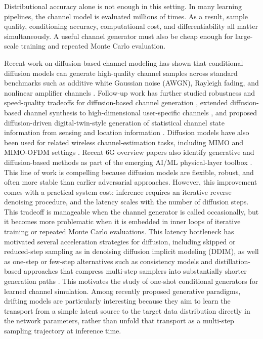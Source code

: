 \documentclass[conference]{IEEEtran}
\begin{document}
Distributional accuracy alone is not enough in this setting.
In many learning pipelines, the channel model is evaluated millions of times.
As a result, sample quality, conditioning accuracy, computational cost, and differentiability all matter simultaneously.
A useful channel generator must also be cheap enough for large-scale training and repeated Monte Carlo evaluation.

Recent work on diffusion-based channel modeling has shown that conditional diffusion models can generate high-quality channel samples across standard benchmarks such as additive white Gaussian noise (AWGN), Rayleigh fading, and nonlinear amplifier channels \cite{paper2309}.
Follow-up work has further studied robustness and speed-quality tradeoffs for diffusion-based channel generation \cite{kimicc2024}, extended diffusion-based channel synthesis to high-dimensional user-specific channels \cite{lee2024highdimchannels}, and proposed diffusion-driven digital-twin-style generation of statistical channel state information from sensing and location information \cite{gong2025dtoc}.
Diffusion models have also been used for related wireless channel-estimation tasks, including MIMO and MIMO-OFDM settings \cite{fesl2024mimoestimation,liu2025mimoofdm}.
Recent 6G overview papers also identify generative and diffusion-based methods as part of the emerging AI/ML physical-layer toolbox \cite{banerjee2026phyanna,roessler2026aiml6g}.
This line of work is compelling because diffusion models \cite{ddpm} are flexible, robust, and often more stable than earlier adversarial approaches.
However, this improvement comes with a practical system cost: inference requires an iterative reverse denoising procedure, and the latency scales with the number of diffusion steps.
This tradeoff is manageable when the channel generator is called occasionally, but it becomes more problematic when it is embedded in inner loops of iterative training or repeated Monte Carlo evaluations. This latency bottleneck has motivated several acceleration strategies for diffusion, including skipped or reduced-step sampling as in denoising diffusion implicit modeling (DDIM), as well as one-step or few-step alternatives such as consistency models and distillation-based approaches that compress multi-step samplers into substantially shorter generation paths \cite{ddim,song2023consistency,yin2024onestep}.
This motivates the study of one-shot conditional generators for learned channel simulation.
Among recently proposed generative paradigms, drifting models \cite{drifting} are particularly interesting because they aim to learn the transport from a simple latent source to the target data distribution directly in the network parameters, rather than unfold that transport as a multi-step sampling trajectory at inference time.
\end{document}
